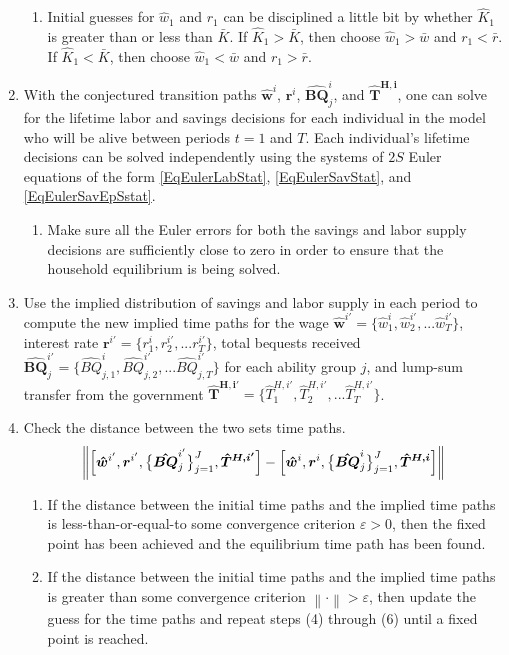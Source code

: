 \documentclass[letterpaper,12pt]{article}
\theoremstyle{definition}
\newcommand\ve{\varepsilon}
\newcommand\norm[1]{\left\lVert#1\right\rVert}
\begin{document}
\begin{enumerate}
      \begin{enumerate}
        \item Initial guesses for $\hat{w}_1$ and $r_1$ can be disciplined a little bit by whether $\hat{K}_1$ is greater than or less than $\bar{K}$. If $\hat{K}_1 > \bar{K}$, then choose $\hat{w}_1 > \bar{w}$ and $r_1 < \bar{r}$. If $\hat{K}_1 < \bar{K}$, then choose $\hat{w}_1 < \bar{w}$ and $r_1 > \bar{r}$.
      \end{enumerate}
    \item With the conjectured transition paths $\bm{\hat{w}}^i$, $\bm{r}^i$, $\bm{\hat{BQ}}_j^i$, and $\bm{\hat{T}^{H,i}}$, one can solve for the lifetime labor and savings decisions for each individual in the model who will be alive between periods $t=1$ and $T$. Each individual's lifetime decisions can be solved independently using the systems of $2S$ Euler equations of the form \eqref{EqEulerLabStat}, \eqref{EqEulerSavStat}, and \eqref{EqEulerSavEpSstat}.
      \begin{enumerate}
        \item Make sure all the Euler errors for both the savings and labor supply decisions are sufficiently close to zero in order to ensure that the household equilibrium is being solved.
      \end{enumerate}
    \item Use the implied distribution of savings and labor supply in each period to compute the new implied time paths for the wage $\bm{\hat{w}}^{i'} = \{\hat{w}_1^i,\hat{w}_2^{i'},...\hat{w}_T^{i'}\}$, interest rate $\bm{r}^{i'} = \{r_1^i,r_2^{i'},...r_T^{i'}\}$, total bequests received $\bm{\hat{BQ}}_j^{i'} = \{\hat{BQ}_{j,1}^i,\hat{BQ}_{j,2}^{i'},...\hat{BQ}_{j,T}^{i'}\}$ for each ability group $j$, and lump-sum transfer from the government $\bm{\hat{T}^{H,i'}} = \{\hat{T}_1^{H,i'},\hat{T}_2^{H,i'},...\hat{T}_T^{H,i'}\}$.
    \item Check the distance between the two sets time paths.
      \begin{equation*}
        \norm{\Bigl[\bm{\hat{w}}^{i'}, \bm{r}^{i'},\bigl\{\bm{\hat{BQ}}_j^{i'}\bigr\}_{j=1}^J, \bm{\hat{T}^{H,i'}}\Bigr] - \Bigl[\bm{\hat{w}}^{i}, \bm{r}^{i},\bigl\{\bm{\hat{BQ}}_j^{i}\bigr\}_{j=1}^J, \bm{\hat{T}^{H,i}}\Bigr]}
      \end{equation*}
      \begin{enumerate}
        \item If the distance between the initial time paths and the implied time paths is less-than-or-equal-to some convergence criterion $\ve>0$, then the fixed point has been achieved and the equilibrium time path has been found.
        \item If the distance between the initial time paths and the implied time paths is greater than some convergence criterion $\norm{\cdot}>\ve$, then update the guess for the time paths and repeat steps (4) through (6) until a fixed point is reached.
      \end{enumerate}
  \end{enumerate}
\end{document}
